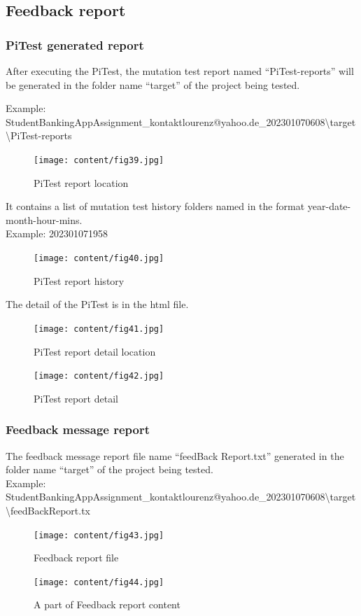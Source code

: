 \subsection{Feedback report}
\subsubsection{PiTest generated report}
After executing the PiTest, the mutation test report named “PiTest-reports” will be generated in the folder name “target” of the project being tested.\par 
Example: \\%
StudentBankingAppAssignment\_kontaktlourenz@yahoo.de\_202301070608\textbackslash{}target\textbackslash{}PiTest-reports
\begin{figure}[h!]
	\centering
	\texttt{[image: content/fig39.jpg]}
	\caption{PiTest report location}
	\label{fig:f11}
\end{figure}

It contains a list of mutation test history folders named in the format year-date-month-hour-mins.\\
Example: 202301071958
\newpage
\begin{figure}[h!]
	\centering
	\texttt{[image: content/fig40.jpg]}
	\caption{PiTest report history}
	\label{fig:f11}
\end{figure}
The detail of the PiTest is in the html file.
\begin{figure}[h!]
	\centering
	\texttt{[image: content/fig41.jpg]}
	\caption{PiTest report detail location}
	\label{fig:f11}
\end{figure}
\newpage
\begin{figure}[h!]
	\centering
	\texttt{[image: content/fig42.jpg]}
	\caption{PiTest report detail}
	\label{fig:f11}
\end{figure}
\newpage
\subsubsection{Feedback message report}
The feedback message report file name “feedBack Report.txt” generated in the folder name “target” of the project being tested.\\
Example: \\%
StudentBankingAppAssignment\_kontaktlourenz@yahoo.de\_202301070608\textbackslash{}target\textbackslash{}feedBackReport.tx
\begin{figure}[h!]
	\centering
	\texttt{[image: content/fig43.jpg]}
	\caption{Feedback report file}
	\label{fig:f11}
\end{figure}

\begin{figure}[h!]
	\centering
	\texttt{[image: content/fig44.jpg]}
	\caption{A part of Feedback report content}
	\label{fig:f11}
\end{figure}




